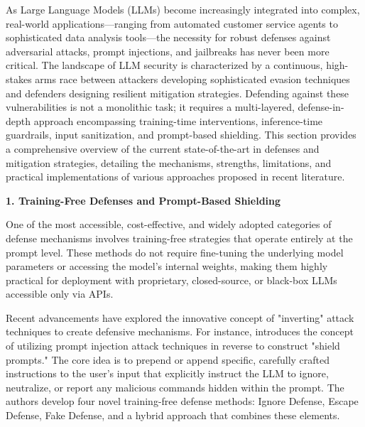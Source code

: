 \documentclass[11pt,a4paper]{article}
\begin{document}
As Large Language Models (LLMs) become increasingly integrated into complex, real-world applications---ranging from automated customer service agents to sophisticated data analysis tools---the necessity for robust defenses against adversarial attacks, prompt injections, and jailbreaks has never been more critical. The landscape of LLM security is characterized by a continuous, high-stakes arms race between attackers developing sophisticated evasion techniques and defenders designing resilient mitigation strategies. Defending against these vulnerabilities is not a monolithic task; it requires a multi-layered, defense-in-depth approach encompassing training-time interventions, inference-time guardrails, input sanitization, and prompt-based shielding. This section provides a comprehensive overview of the current state-of-the-art in defenses and mitigation strategies, detailing the mechanisms, strengths, limitations, and practical implementations of various approaches proposed in recent literature.

\textbf{1. Training-Free Defenses and Prompt-Based Shielding}

One of the most accessible, cost-effective, and widely adopted categories of defense mechanisms involves training-free strategies that operate entirely at the prompt level. These methods do not require fine-tuning the underlying model parameters or accessing the model's internal weights, making them highly practical for deployment with proprietary, closed-source, or black-box LLMs accessible only via APIs. 

Recent advancements have explored the innovative concept of "inverting" attack techniques to create defensive mechanisms. For instance, \cite{Chen_2024_Defense} introduces the concept of utilizing prompt injection attack techniques in reverse to construct "shield prompts." The core idea is to prepend or append specific, carefully crafted instructions to the user's input that explicitly instruct the LLM to ignore, neutralize, or report any malicious commands hidden within the prompt. The authors develop four novel training-free defense methods: Ignore Defense, Escape Defense, Fake Defense, and a hybrid approach that combines these elements. 
\end{document}
